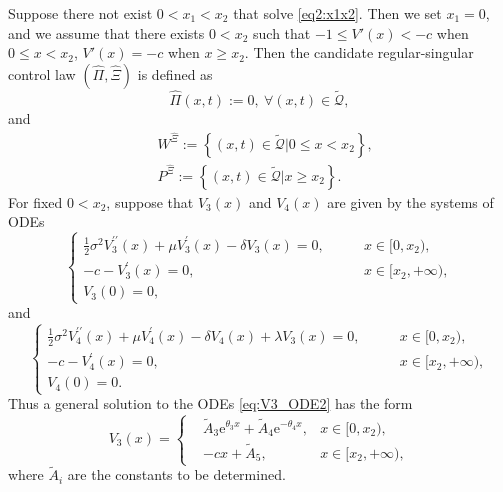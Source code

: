 \documentclass[11pt,reqno]{article}%
\numberwithin{equation}{section}
\begin{document}
Suppose there not exist  $0 < x_1 < x_2$  that solve \eqref{eq2:x1x2}. Then we set $x_1=0$, and we assume that there exists $ 0< x_2$ such that $-1\le V'(x) < -c$ when $0\le x < x_2$, $V'(x) =-c$ when $x\ge x_2$. Then the candidate regular-singular control law $\left(\hat\Pi,\hat\Xi\right)$ is defined as 
\begin{equation}\label{hatpideg2}
\hat \Pi(x,t) := 0,\ \forall (x,t)\in\mathcal{\tilde{Q}},
\end{equation}
and
\begin{equation}
\begin{aligned}
&W^{\hat{\Xi}}:=\left\{(x,t)\in\mathcal{\tilde{Q}}|0\leq x< x_2\right\},\\
&P^{\hat{\Xi}}:=\left\{(x,t)\in\mathcal{\tilde{Q}}|x\ge x_2\right\}.
\end{aligned}\label{hatxideg2}
\end{equation}
For fixed $0< x_2$, suppose that $V_3(x)$ and $V_4(x)$ are given by the systems of ODEs
\begin{equation}\label{eq:V3_ODE2}
\begin{cases}
\frac{1}{2} \sigma^2 V^{\prime\prime}_3(x) + \mu V^\prime_3(x) - \delta V_3(x) = 0, \qquad & x \in [0, x_2),\\
-c- V^\prime_3(x) = 0, & x \in [x_2, +\infty),\\
V_3(0)=0,
\end{cases}
\end{equation}
and
\begin{equation}\label{eq:V4_ODE2}
\begin{cases}
\frac{1}{2} \sigma^2 V^{\prime\prime}_4(x) + \mu V^\prime_4(x) - \delta V_4(x)+\lambda V_3(x) = 0, \qquad & x \in [0, x_2),\\
-c- V^\prime_4(x) = 0, & x \in [x_2, +\infty),\\
V_4(0)=0.
\end{cases}
\end{equation}
Thus a general solution to the ODEs \eqref{eq:V3_ODE2} has the form
\begin{equation}\label{V3deg}
V_3(x) = \left\{\begin{aligned}
& \tilde{A}_{3} \mathrm{e}^{\theta_{3} x} + \tilde{A}_{4} \mathrm{e}^{-\theta_{4}x}, & x \in [0, x_2),\\
& -cx + \tilde{A}_{5}, \qquad & x \in [x_2, +\infty),
\end{aligned}\right.
\end{equation}
where $\tilde{A}_{i}$ are the constants to be determined.
\end{document}
